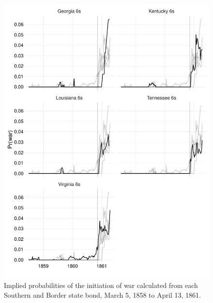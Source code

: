 \documentclass[]{article}\usepackage[]{graphicx}\usepackage[]{color}
\begin{document}
\begin{figure}
  \centering
  \includegraphics[width=\textwidth]{./figures/fig_prwar1-1}
  \caption{Implied probabilities of the initiation of war calculated from each Southern and Border state bond, March  5, 1858 to April 13, 1861.}
  \label{fig:prwar1}
\end{figure}
\end{document}
